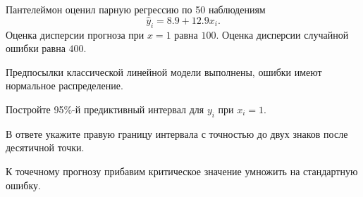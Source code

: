 
\begin{question}
Пантелеймон оценил парную регрессию по 50 наблюдениям
\[
\hat y_i = 8.9 + 12.9 x_i.
\]
Оценка дисперсии прогноза при \(x=1\) равна \(100\).
Оценка дисперсии случайной ошибки равна \(400\).

Предпосылки классической линейной модели выполнены, ошибки имеют нормальное распределение.

Постройте 95\%-й предиктивный интервал для \(y_i\) при \(x_i = 1\).

В ответе укажите правую границу интервала с точностью до двух знаков после десятичной точки.
\end{question}

\begin{solution}
К точечному прогнозу прибавим критическое значение умножить на стандартную ошибку.
\end{solution}

